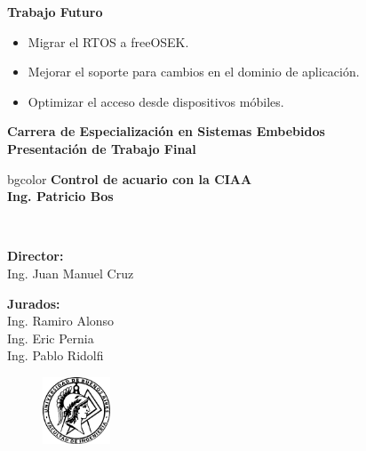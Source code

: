 \documentclass[11pt]{beamer}
\begin{document}
\begin{frame}{\textbf{\LARGE{Trabajo Futuro}}}
	\fontsize{16pt}{16}\selectfont
	\begin{itemize}
		\item Migrar el RTOS a freeOSEK.
		\vspace{15px}
		\item Mejorar el soporte para cambios en el dominio de aplicación.
		\vspace{15px}
		\item Optimizar el acceso desde dispositivos móbiles.
	\end{itemize}
\end{frame}

\begin{frame}
	\begin{center}
\vspace{5px}	
	\large\textbf{Carrera de Especialización en Sistemas Embebidos}\\
	\vspace{10px}
	\Large\textbf{Presentación de Trabajo Final}\\
	\vspace{5px}
	\hfill
	    \begin{beamercolorbox}[center,dp=2ex,ht=.25\textheight, wd=1\paperwidth]{bgcolor}
	        \huge\textbf{Control de acuario con la CIAA}\\
	    		\vspace{5px}
			\Large\textbf{Ing. Patricio Bos}\\
	    \end{beamercolorbox}
	\hfill\hfill
	\\
	\vspace{-5px}
	\begin{minipage}[t]{0.4\textwidth}
		\begin{flushleft} \large
			\textbf{Director:}\\
			Ing. Juan Manuel Cruz\\
		\end{flushleft}
	\end{minipage}
	\begin{minipage}[t]{0.4\textwidth}
		\begin{flushright} \large
			\textbf{Jurados:} \\
			Ing. Ramiro Alonso \\
			Ing. Eric Pernia\\
			Ing. Pablo Ridolfi\\
		\end{flushright}
	\end{minipage}
	\vfill
	\begin{figure}[H]
		\includegraphics[width=2cm]{./imagenes/logo_facu_circle}
	\end{figure}	
	\vspace{5px}
	\end{center}
\end{frame}
\end{document}
